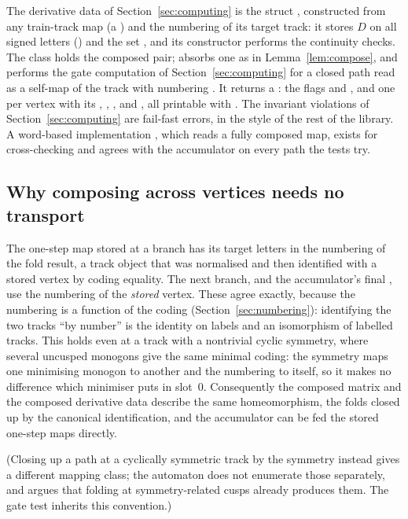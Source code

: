 \documentclass[12pt]{amsart}
\newcommand{\Dg}{D}                       %
\theoremstyle{plain}
\theoremstyle{definition}
\begin{document}
The derivative data of Section~\ref{sec:computing} is the struct
, constructed from any train-track map (a
) and the numbering of its target track: it
stores $\Dg$ on all signed letters () and the set
, and its constructor performs the continuity checks.  The
class  holds the composed pair; 
absorbs one  as in Lemma~\ref{lem:compose}, and
 performs the gate computation of
Section~\ref{sec:computing} for a closed path read as a self-map of the
track with numbering .  It returns a : the
flags  and , and one
 per vertex with its ,
, ,  and , all
printable with .  The invariant violations of
Section~\ref{sec:computing} are fail-fast errors, in the style of the
rest of the library.  A word-based implementation
, which reads a fully composed map, exists for
cross-checking and agrees with the accumulator on every path the tests
try.

\subsection{Why composing across vertices needs no transport}
\label{sec:labels}
The one-step map stored at a branch has its target letters in the
numbering of the fold result, a track object that was normalised and
then identified with a stored vertex by coding equality.  The next
branch, and the accumulator's final , use the numbering of
the \emph{stored} vertex.  These agree exactly, because the numbering is
a function of the coding (Section~\ref{sec:numbering}): identifying the
two tracks ``by number'' is the identity on labels and an isomorphism of
labelled tracks.  This holds even at a track with a nontrivial cyclic
symmetry, where several uncusped monogons give the same minimal coding:
the symmetry maps one minimising monogon to another and the numbering to
itself, so it makes no difference which minimiser 
puts in slot~$0$.  Consequently the composed matrix and the composed
derivative data describe the same homeomorphism, the folds closed up by
the canonical identification, and the accumulator can be fed the stored
one-step maps directly.

(Closing up a path at a cyclically symmetric track by the symmetry
instead gives a different mapping class; the automaton does not
enumerate those separately, and \cite[\S ``Cyclic symmetry'']{Lanneau2011}
argues that folding at symmetry-related cusps already produces them.  The
gate test inherits this convention.)
\end{document}
